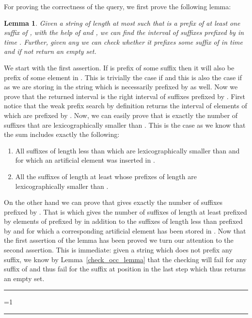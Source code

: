 \documentclass{article}
\newcommand{\?}{\mskip1.5mu}
\newtheorem{lemma}{Lemma}
\newcounter{noqed}
\newcommand{\qed}{ \ifmmode\mbox{
}\fi\rule[-.05em]{.3em}{.7em}\setcounter{noqed}{0}}
\newenvironment{proof}[1][{}]{\noindent{\bf Proof#1.
}\setcounter{noqed}{1}}{\ifnum\value{noqed}=1\qed\fi\par\medskip}
\begin{document}
For proving the correctness of the query, we first prove the following lemma:
\begin{lemma}
Given a string  of length at most  such that  is a prefix of at least one suffix of , with the help of  and , we can find the interval of suffixes prefixed by  in time  . Further, given any  we can check whether it prefixes some suffix of  in time  and if not return an empty set. 
\end{lemma}
\begin{proof}
We start with the first assertion. If  is prefix of some suffix  then it will also be prefix of some element in . This is trivially the case if  and this is also the case if  as we are storing in  the string  which is necessarily prefixed by  as well. Now we prove that the returned interval  is the right interval of suffixes prefixed by . First notice that the weak prefix search by definition returns the interval  of elements of  which are prefixed by . Now, we can easily prove that  is exactly the number of suffixes that are lexicographically smaller than . This is the case as we know that the sum  includes exactly the following:
\begin{enumerate}
\item All suffixes of length less than  which are lexicographically smaller than  and for which an artificial element was inserted in . 
\item All the suffixes of length at least  whose prefixes of length  are lexicographically smaller than . 
\end{enumerate}
On the other hand we can prove that  gives exactly the number of suffixes prefixed by . That is  which gives the number of suffixes of length at least  prefixed by elements of  prefixed by  in addition to the suffixes of length less than  prefixed by  and for which a corresponding artificial element has been stored in . Now that the first assertion of the lemma has been proved we turn our attention to the second assertion. This is immediate: given a string  which does not prefix any suffix, we know by Lemma~\ref{check_occ_lemma} that the checking will fail for any suffix of  and thus fail for the suffix at position  in the last step which thus returns an empty set. 
\qed
\end{proof}
\end{document}
